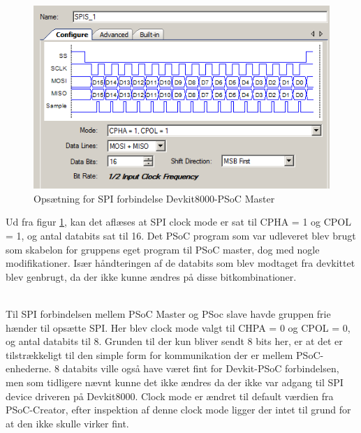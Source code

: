 \begin{figure}[H]
	\centerline{\includegraphics[scale=0.8]{tex/Design/SPI/Clock_mode_SPI}}
	\caption{Opsætning for SPI forbindelse Devkit8000-PSoC Master}
	\label{SPI_opsaetning}
\end{figure}

Ud fra figur \ref{SPI_opsaetning}, kan det aflæses at SPI clock mode er sat til CPHA = 1 og CPOL = 1, og antal databits sat til 16. Det PSoC program som var 
udleveret blev brugt som skabelon for gruppens eget program til PSoC master, dog med nogle modifikationer. Især håndteringen af de databits som blev modtaget 
fra devkittet blev genbrugt, da der ikke kunne ændres på disse bitkombinationer.

\\
Til SPI forbindelsen mellem PSoC Master og PSoc slave havde gruppen frie hænder til opsætte SPI. Her blev clock mode valgt til CHPA = 0 og CPOL = 0, og 
antal databits til 8. Grunden til der kun bliver sendt 8 bits her, er at det er tilstrækkeligt til den simple form for kommunikation der er mellem PSoC-enhederne.
8 databits ville også have været fint for Devkit-PSoC forbindelsen, men som tidligere nævnt kunne det ikke ændres da der ikke var adgang til SPI device driveren
på Devkit8000. Clock mode er ændret til default værdien fra PSoC-Creator, efter inspektion af denne clock mode ligger der intet til grund for at den ikke
skulle virker fint. 

